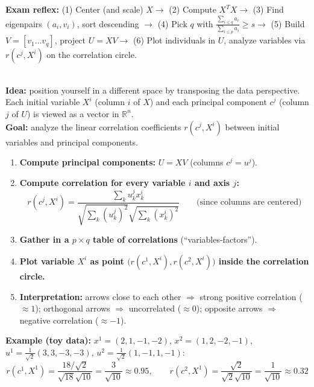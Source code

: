 \documentclass[10pt,a4paper]{article}
\begin{document}
\vspace{1pt}
\begin{tcolorbox}[
    colframe=themeblue,
    colback=lightbg,
    arc=1.5mm,
    boxrule=0.5pt,
    left=8pt, right=8pt, top=3pt, bottom=3pt
]
\textbf{\color{themeblue}Exam reflex:} (1) Center (and scale) $X \rightarrow$ (2) Compute $X^T X \rightarrow$ (3) Find eigenpairs $(a_i, v_i)$, sort descending $\rightarrow$ (4) Pick $q$ with $\frac{\sum_{i \le q} a_i}{\sum_{i \le p} a_i} \ge s \rightarrow$ (5) Build $V = [v_1 \dots v_q]$, project $U = XV \rightarrow$ (6) Plot individuals in $U$, analyze variables via $r(c^j, X^i)$ on the correlation circle.
\end{tcolorbox}

\newpage

\\[4pt]
\textbf{Idea:} position yourself in a different space by transposing the data perspective. Each initial variable $X^i$ (column $i$ of $X$) and each principal component $c^j$ (column $j$ of $U$) is viewed as a vector in $\mathbb{R}^n$.\\[4pt]
\textbf{Goal:} analyze the linear correlation coefficients $r(c^j, X^i)$ between initial variables and principal components.

\begin{enumerate}[leftmargin=18pt, itemsep=3pt, topsep=2pt]
    \item \textbf{Compute principal components:} $U = XV$ (columns $c^j = u^j$).
    \item \textbf{Compute correlation for every variable $i$ and axis $j$:}
    \[
    r(c^j, X^i) = \frac{\sum_k u_k^j x_k^i}{\sqrt{\sum_k (u_k^j)^2}\sqrt{\sum_k (x_k^i)^2}} \qquad \text{(since columns are centered)}
    \]
    \item \textbf{Gather in a $p \times q$ table of correlations} (``variables-factors'').
    \item \textbf{Plot variable $X^i$ as point $\big(r(c^1, X^i), r(c^2, X^i)\big)$ inside the correlation circle.}
    \item \textbf{Interpretation:} arrows close to each other $\Rightarrow$ strong positive correlation ($\approx 1$); orthogonal arrows $\Rightarrow$ uncorrelated ($\approx 0$); opposite arrows $\Rightarrow$ negative correlation ($\approx -1$).
\end{enumerate}

\noindent\textcolor{accentred}{\textbf{Example (toy data):}} $x^1 = (2, 1, -1, -2)$, $x^2 = (1, 2, -2, -1)$, $u^1 = \frac{1}{\sqrt{2}}(3, 3, -3, -3)$, $u^2 = \frac{1}{\sqrt{2}}(1, -1, 1, -1)$:
\[
r(c^1, X^1) = \frac{18/\sqrt{2}}{\sqrt{18}\sqrt{10}} = \frac{3}{\sqrt{10}} \approx 0.95, \qquad r(c^2, X^1) = \frac{\sqrt{2}}{\sqrt{2}\sqrt{10}} = \frac{1}{\sqrt{10}} \approx 0.32
\]
\end{document}
